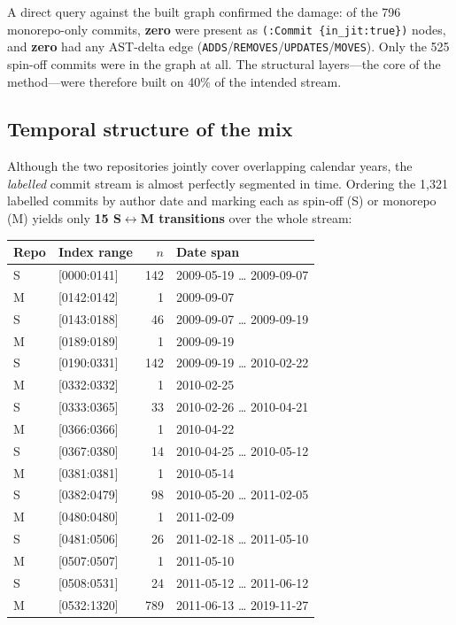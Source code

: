 \documentclass[11pt]{article}
\newcommand{\code}[1]{\texttt{#1}}
\begin{document}
A direct query against the built graph confirmed the damage: of the 796
monorepo-only commits, \textbf{zero} were present as
\code{(:Commit \{in\_jit:true\})} nodes, and \textbf{zero} had any AST-delta
edge (\code{ADDS}/\code{REMOVES}/\code{UPDATES}/\code{MOVES}). Only the 525
spin-off commits were in the graph at all. The structural layers---the core of
the method---were therefore built on 40\% of the intended stream.

\subsection{Temporal structure of the mix}
Although the two repositories jointly cover overlapping calendar years, the
\emph{labelled} commit stream is almost perfectly segmented in time. Ordering
the 1{,}321 labelled commits by author date and marking each as spin-off (S) or
monorepo (M) yields only \textbf{15 S$\leftrightarrow$M transitions} over the
whole stream:

\begin{center}
\begin{tabular}{@{}llrl@{}}
\toprule
Repo & Index range & $n$ & Date span \\
\midrule
S & [0000:0141]   & 142 & 2009-05-19 \ldots{} 2009-09-07 \\
M & [0142:0142]   & 1   & 2009-09-07 \\
S & [0143:0188]   & 46  & 2009-09-07 \ldots{} 2009-09-19 \\
M & [0189:0189]   & 1   & 2009-09-19 \\
S & [0190:0331]   & 142 & 2009-09-19 \ldots{} 2010-02-22 \\
M & [0332:0332]   & 1   & 2010-02-25 \\
S & [0333:0365]   & 33  & 2010-02-26 \ldots{} 2010-04-21 \\
M & [0366:0366]   & 1   & 2010-04-22 \\
S & [0367:0380]   & 14  & 2010-04-25 \ldots{} 2010-05-12 \\
M & [0381:0381]   & 1   & 2010-05-14 \\
S & [0382:0479]   & 98  & 2010-05-20 \ldots{} 2011-02-05 \\
M & [0480:0480]   & 1   & 2011-02-09 \\
S & [0481:0506]   & 26  & 2011-02-18 \ldots{} 2011-05-10 \\
M & [0507:0507]   & 1   & 2011-05-10 \\
S & [0508:0531]   & 24  & 2011-05-12 \ldots{} 2011-06-12 \\
M & [0532:1320]   & 789 & 2011-06-13 \ldots{} 2019-11-27 \\
\bottomrule
\end{tabular}
\end{center}
\end{document}
